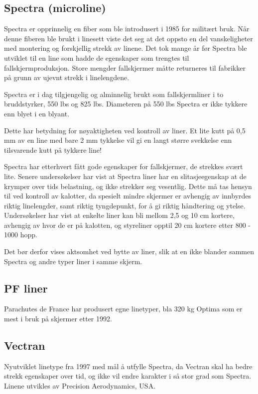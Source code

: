 \subsection{Spectra (microline)}
Spectra er opprinnelig en fiber som ble introdusert i 1985 for militært bruk. Når denne fiberen ble brukt i linesett viste det seg at det oppsto en del vanskeligheter med montering og forskjellig strekk av linene. Det tok mange år før Spectra ble utviklet til en line som hadde de egenskaper som trengtes til fallskjermproduksjon. Store mengder fallskjermer måtte returneres til fabrikker på grunn av ujevnt strekk i linelengdene.

Spectra er i dag tilgjengelig og alminnelig brukt som fallskjermliner i to bruddstyrker, 550 lbs og 825 lbs. Diameteren på 550 lbs Spectra er ikke tykkere enn blyet i en blyant.

Dette har betydning for nøyaktigheten ved kontroll av liner. Et lite kutt på 0,5 mm av en line med bare 2 mm tykkelse vil gi en langt større svekkelse enn tilsvarende kutt på tykkere line!

Spectra har etterhvert fått gode egenskaper for fallskjermer, de strekkes svært lite. Senere undersøkelser har vist at Spectra liner har en slitasjeegenskap at de krymper over tids belastning, og ikke strekker seg vesentlig. Dette må tas hensyn til ved kontroll av kalotter, da spesielt mindre skjermer er avhengig av innbyrdes riktig linelengder, samt riktig tyngdepunkt, for å gi riktig håndtering og ytelse. Undersøkelser har vist at enkelte liner kan bli mellom 2,5 og 10 cm kortere, avhengig av hvor de er på kalotten, og styreliner opptil 20 cm kortere etter 800 - 1000 hopp.

Det bør derfor vises aktsomhet ved bytte av liner, slik at en ikke blander sammen Spectra og andre typer liner i samme skjerm.

\subsection{PF liner}
Parachutes de France har produsert egne linetyper, bla 320 kg Optima som er mest i bruk på skjermer etter 1992.

\subsection{Vectran}
Nyutviklet linetype fra 1997 med mål å utfylle Spectra, da Vectran skal ha bedre strekk egenskaper over tid, og ikke vil endre karakter i så stor grad som Spectra. Linene utvikles av Precision Aerodynamics, USA.

